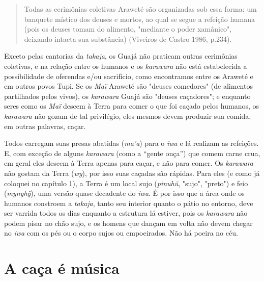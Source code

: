 \begin{quote}
Todas as cerimônias coletivas Araweté são organizadas sob essa forma: um
banquete místico dos deuses e mortos, ao qual se segue a refeição humana
(pois os deuses tomam do alimento, "mediante o poder xamânico", deixando
intacta sua substância) (Viveiros de Castro 1986, p.234).
\end{quote}

Exceto pelas cantorias da \emph{takaja}, os Guajá não praticam outras
cerimônias coletivas, e na relação entre os humanos e os \emph{karawara}
não está estabelecida a possibilidade de oferendas e/ou sacrifício, como
encontramos entre os Araweté e em outros povos Tupi. Se os \emph{Maï}
Araweté são "deuses comedores" (de alimentos partilhados pelos vivos),
os \emph{karawara} Guajá são "deuses caçadores"; e enquanto seres como
os \emph{Maï} descem à Terra para comer o que foi caçado pelos humanos,
os \emph{karawara} não gozam de tal privilégio, eles mesmos devem
produzir sua comida, em outras palavras, caçar.

Todos carregam suas presas abatidas (\emph{ma'a}) para o \emph{iwa} e lá
realizam as refeições. E, com exceção de alguns \emph{karawara} (como a
``gente onça'') que comem carne crua, em geral eles descem à Terra
apenas para caçar, e não para comer. Os \emph{karawara} não gostam da
Terra (\emph{wy}), por isso suas caçadas são rápidas. Para eles (e como
já coloquei no capítulo 1), a Terra é um local sujo (\emph{pinuhũ},
"sujo", "preto") e feio (\emph{mynyhỹ}), uma versão quase decadente do
\emph{iwa}. É por isso que a área onde os humanos constroem a
\emph{takaja}, tanto seu interior quanto o pátio no entorno, deve ser
varrida todos os dias enquanto a estrutura lá estiver, pois os
\emph{karawara} não podem pisar no chão sujo, e os homens que dançam em
volta não devem chegar no \emph{iwa} com os pés ou o corpo sujos ou
empoeirados. Não há poeira no céu.

\section{A caça é música}\label{a-cauxe7a-uxe9-muxfasica}


